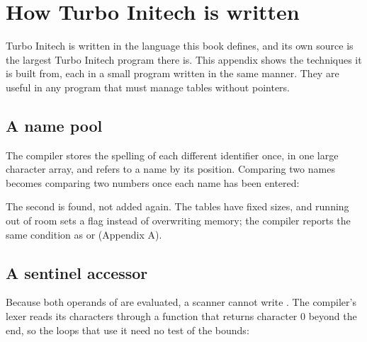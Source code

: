 \chapter{How Turbo Initech is written}

Turbo Initech is written in the language this book defines, and its own
source is the largest Turbo Initech program there is.  This appendix shows
the techniques it is built from, each in a small program written in the
same manner.  They are useful in any program that must manage tables
without pointers.

\section{A name pool}
The compiler stores the spelling of each different identifier once, in one
large character array, and refers to a name by its position.  Comparing two
names becomes comparing two numbers once each name has been entered:



The second  is found, not added again.  The tables have fixed
sizes, and running out of room sets a flag instead of overwriting memory;
the compiler reports the same condition as  or  (Appendix A).

\section{A sentinel accessor}
Because both operands of  are evaluated, a scanner cannot write
.  The compiler's lexer reads
its characters through a function that returns character 0 beyond the end,
so the loops that use it need no test of the bounds:

